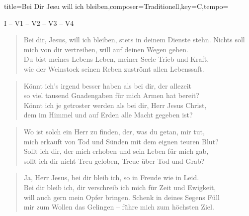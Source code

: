 \documentclass{leadsheet-modern}
\begin{document}
\begin{song}{title={Bei Dir Jesu will ich bleiben},composer={Traditionell},key={C},tempo={}}

\begin{schedule}
I -- V1 -- V2 -- V3 -- V4
\end{schedule}
\begin{verse}
Bei dir, Jesus, will ich bleiben, stets in deinem Dienste stehn.
Nichts soll mich von dir vertreiben, will auf deinen Wegen gehen. \\
Du bist meines Lebens Leben, meiner Seele Trieb und Kraft, \\
wie der Weinstock seinen Reben zuströmt allen Lebenssaft.
\end{verse}
\begin{verse}
Könnt ich's irgend besser haben als bei dir, der allezeit \\
so viel tausend Gnadengaben für mich Armen hat bereit? \\
Könnt ich je getroster werden als bei dir, Herr Jesus Christ, \\
dem im Himmel und auf Erden alle Macht gegeben ist?
\end{verse}
\begin{verse}
Wo ist solch ein Herr zu finden, der, was du getan, mir tut, \\
mich erkauft von Tod und Sünden mit dem eignen teuren Blut? \\
Sollt ich dir, der mich erhoben und sein Leben für mich gab, \\
sollt ich dir nicht Treu geloben, Treue über Tod und Grab?
\end{verse}
\begin{verse}
Ja, Herr Jesus, bei dir bleib ich, so in Freude wie in Leid. \\
Bei dir bleib ich, dir verschreib ich mich für Zeit und Ewigkeit, \\
will auch gern mein Opfer bringen. Schenk in deines Segens Füll \\
mir zum Wollen das Gelingen -- führe mich zum höchsten Ziel. 
\end{verse}

\end{song}
\end{document}

